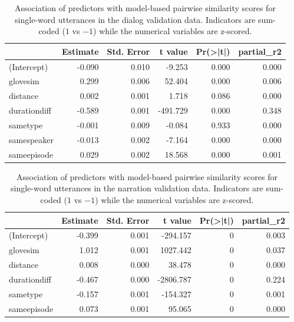 \begin{table}
  \centering

\begin{tabular}{lrrrrr}
\toprule
  & Estimate & Std. Error & t value & Pr(>|t|) & partial\_r2\\
\midrule
(Intercept) & -0.090 & 0.010 & -9.253 & 0.000 & 0.000\\
glovesim & 0.299 & 0.006 & 52.404 & 0.000 & 0.006\\
distance & 0.002 & 0.001 & 1.718 & 0.086 & 0.000\\
durationdiff & -0.589 & 0.001 & -491.729 & 0.000 & 0.348\\
sametype & -0.001 & 0.009 & -0.084 & 0.933 & 0.000\\
samespeaker & -0.013 & 0.002 & -7.164 & 0.000 & 0.000\\
sameepisode & 0.029 & 0.002 & 18.568 & 0.000 & 0.001\\
  \bottomrule
\end{tabular}
\caption{Association of predictors with model-based pairwise
  similarity scores for single-word utterances in the dialog
  validation data. Indicators are sum-coded ($1$ vs $-1$) while the
  numerical variables are z-scored.}
\label{tab:dialog-lm}
\end{table}



\begin{table}
  \centering
\begin{tabular}{lrrrrr}
\toprule
  & Estimate & Std. Error & t value & Pr(>|t|) & partial\_r2\\
\midrule
(Intercept) & -0.399 & 0.001 & -294.157 & 0 & 0.003\\
glovesim & 1.012 & 0.001 & 1027.442 & 0 & 0.037\\
distance & 0.008 & 0.000 & 38.478 & 0 & 0.000\\
durationdiff & -0.467 & 0.000 & -2806.787 & 0 & 0.224\\
sametype & -0.157 & 0.001 & -154.327 & 0 & 0.001\\
sameepisode & 0.073 & 0.001 & 95.065 & 0 & 0.000\\
\bottomrule
\end{tabular}
\caption{Association of predictors with model-based pairwise
  similarity scores for single-word utterances in the narration
  validation data. Indicators are sum-coded ($1$ vs $-1$) while the
  numerical variables are z-scored.}
\label{tab:narration-lm}
\end{table}

